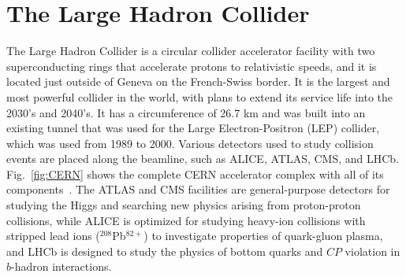 \section{The Large Hadron Collider}
\label{sec:LHC}

The Large Hadron Collider is a circular collider accelerator facility with two superconducting rings that accelerate protons to relativistic speeds, and it is located just outside of Geneva on the French-Swiss border.
It is the largest and most powerful collider in the world, with plans to extend its service life into the 2030's and 2040's.
It has a circumference of 26.7 km and was built into an existing tunnel that was used for the Large Electron-Positron (LEP) collider, which was used from 1989 to 2000.
Various detectors used to study collision events are placed along the beamline, such as ALICE, ATLAS, CMS, and LHCb.
Fig.~\ref{fig:CERN} shows the complete CERN accelerator complex with all of its components~\cite{Mobs:2636343}.
The ATLAS and CMS facilities are general-purpose detectors for studying the Higgs and searching new physics arising from proton-proton collisions, while ALICE is optimized for studying heavy-ion collisions with stripped lead ions ($^{208}$Pb$^{82+}$) to investigate properties of quark-gluon plasma, and LHCb is designed to study the physics of bottom quarks and $CP$ violation in $b$-hadron interactions.

